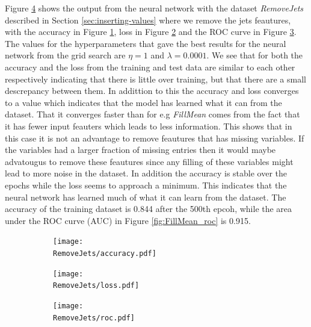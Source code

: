 \documentclass[../../main/main.tex]{subfiles}
\begin{document}
Figure \ref{fig:RemoveJets_1} shows the output from the neural network with the dataset \emph{RemoveJets} described in Section \ref{sec:inserting-values} where we remove the jets feautures, with the accuracy in Figure \ref{fig:RemoveJets_acc}, loss in Figure \ref{fig:RemoveJets_loss} and the ROC curve in Figure \ref{fig:RemoveJets_roc}. The values for the hyperparameters that gave the best results for the neural network from the grid search are \(\eta=1\) and \(\lambda=0.0001\). We see that for both the accuracy and the loss from the training and test data are similar to each other respectively indicating that there is little over training, but that there are a small descrepancy between them. In addittion to this the accuracy and loss converges to a value which indicates that the model has learned what it can from the dataset. That it converges faster than for e.g \emph{FillMean} comes from the fact that it has fewer input feauters which leads to less information. This shows that in this case it is not an advantage to remove feautures that has missing variables. If the variables had a larger fraction of missing entries then it would maybe advatougus to remove these feautures since any filling of these variables might lead to more noise in the dataset. In addition the accuracy is stable over the epochs while the loss seems to approach a minimum. This indicates that the neural network has learned much of what it can learn from the dataset. The accuracy of the training dataset is 0.844 after the 500th epcoh, while the area under the ROC curve (AUC) in Figure \ref{fig:FillMean_roc} is 0.915.

\begin{figure}[H]
  \centering
  \begin{subfigure}[t]{0.5\textwidth}
    \centering
    \texttt{[image: \\RemoveJets/accuracy.pdf]}
    \caption{\captionAcc}
    \label{fig:RemoveJets_acc}
  \end{subfigure}
  \vspace{0.01cm}
  \begin{subfigure}[t]{0.5\textwidth}
    \centering
    \texttt{[image: \\RemoveJets/loss.pdf]}
    \caption{\captionLoss}
    \label{fig:RemoveJets_loss}
  \end{subfigure}
  \begin{subfigure}[t]{0.5\textwidth}
    \centering
    \texttt{[image: \\RemoveJets/roc.pdf]}
    \caption{\captionROC}
    \label{fig:RemoveJets_roc}
  \end{subfigure}
  \caption{}
  \label{fig:RemoveJets_1}  
\end{figure}
\end{document}
